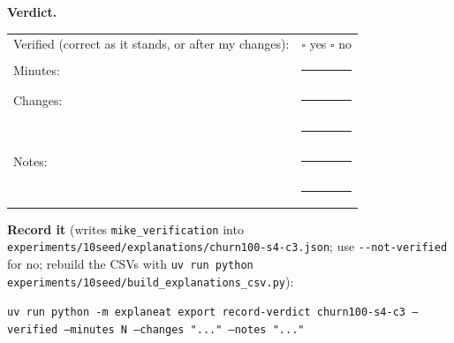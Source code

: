 \documentclass[a4paper,11pt]{article}
\begin{document}
\textbf{Verdict.}

\begin{tabularx}{\linewidth}{@{}lX@{}}
Verified (correct as it stands, or after my changes): & $\square$ yes \quad $\square$ no \\[4pt]
Minutes: & \rule{3cm}{0.4pt} \\[4pt]
Changes: & \rule{\linewidth}{0.4pt} \\[10pt]
 & \rule{\linewidth}{0.4pt} \\[4pt]
Notes: & \rule{\linewidth}{0.4pt} \\[10pt]
 & \rule{\linewidth}{0.4pt} \\
\end{tabularx}

\textbf{Record it} (writes \texttt{mike\_verification} into \texttt{experiments/10seed/explanations/churn100-s4-c3.json}; use \texttt{-{}-not-verified} for no; rebuild the CSVs with \texttt{uv run python experiments/10seed/build\_explanations\_csv.py}):

{\footnotesize\raggedright\texttt{uv run python -m explaneat export record-verdict churn100-s4-c3 --verified --minutes N --changes "..." --notes "..."}\par}


\clearpage




















\clearpage
\end{document}
